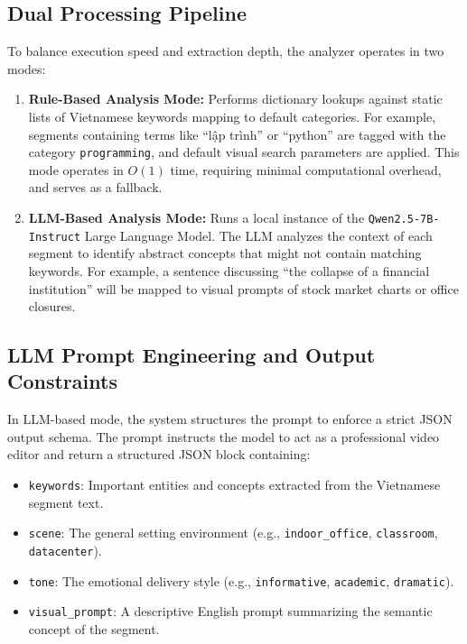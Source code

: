 \documentclass[a4paper,12pt]{report}
\begin{document}
\subsection{Dual Processing Pipeline}
To balance execution speed and extraction depth, the analyzer operates in two modes:
\begin{enumerate}
    \item \textbf{Rule-Based Analysis Mode:} Performs dictionary lookups against static lists of Vietnamese keywords mapping to default categories. For example, segments containing terms like ``lập trình'' or ``python'' are tagged with the category \texttt{programming}, and default visual search parameters are applied. This mode operates in $O(1)$ time, requiring minimal computational overhead, and serves as a fallback.
    \item \textbf{LLM-Based Analysis Mode:} Runs a local instance of the \texttt{Qwen2.5-7B-Instruct} Large Language Model. The LLM analyzes the context of each segment to identify abstract concepts that might not contain matching keywords. For example, a sentence discussing ``the collapse of a financial institution'' will be mapped to visual prompts of stock market charts or office closures.
\end{enumerate}

\subsection{LLM Prompt Engineering and Output Constraints}
In LLM-based mode, the system structures the prompt to enforce a strict JSON output schema. The prompt instructs the model to act as a professional video editor and return a structured JSON block containing:
\begin{itemize}
    \item \texttt{keywords}: Important entities and concepts extracted from the Vietnamese segment text.
    \item \texttt{scene}: The general setting environment (e.g., \texttt{indoor\_office}, \texttt{classroom}, \texttt{datacenter}).
    \item \texttt{tone}: The emotional delivery style (e.g., \texttt{informative}, \texttt{academic}, \texttt{dramatic}).
    \item \texttt{visual\_prompt}: A descriptive English prompt summarizing the semantic concept of the segment.
\end{itemize}
\end{document}
